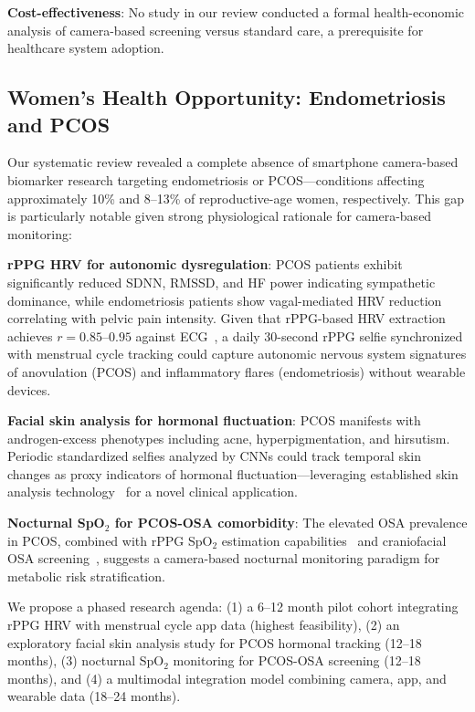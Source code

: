 \documentclass[conference]{IEEEtran}
\begin{document}
\textbf{Cost-effectiveness}: No study in our review conducted a formal health-economic analysis of camera-based screening versus standard care, a prerequisite for healthcare system adoption.

\subsection{Women's Health Opportunity: Endometriosis and PCOS}

Our systematic review revealed a complete absence of smartphone camera-based biomarker research targeting endometriosis or PCOS---conditions affecting approximately 10\% and 8--13\% of reproductive-age women, respectively. This gap is particularly notable given strong physiological rationale for camera-based monitoring:

\textbf{rPPG HRV for autonomic dysregulation}: PCOS patients exhibit significantly reduced SDNN, RMSSD, and HF power indicating sympathetic dominance, while endometriosis patients show vagal-mediated HRV reduction correlating with pelvic pain intensity. Given that rPPG-based HRV extraction achieves $r=0.85$--$0.95$ against ECG~\cite{rppgreview2024frontiers}, a daily 30-second rPPG selfie synchronized with menstrual cycle tracking could capture autonomic nervous system signatures of anovulation (PCOS) and inflammatory flares (endometriosis) without wearable devices.

\textbf{Facial skin analysis for hormonal fluctuation}: PCOS manifests with androgen-excess phenotypes including acne, hyperpigmentation, and hirsutism. Periodic standardized selfies analyzed by CNNs could track temporal skin changes as proxy indicators of hormonal fluctuation---leveraging established skin analysis technology~\cite{naqvi2023skincancer} for a novel clinical application.

\textbf{Nocturnal SpO$_2$ for PCOS-OSA comorbidity}: The elevated OSA prevalence in PCOS, combined with rPPG SpO$_2$ estimation capabilities~\cite{cheng2024contactless} and craniofacial OSA screening~\cite{osa2025jcsm}, suggests a camera-based nocturnal monitoring paradigm for metabolic risk stratification.

We propose a phased research agenda: (1) a 6--12 month pilot cohort integrating rPPG HRV with menstrual cycle app data (highest feasibility), (2) an exploratory facial skin analysis study for PCOS hormonal tracking (12--18 months), (3) nocturnal SpO$_2$ monitoring for PCOS-OSA screening (12--18 months), and (4) a multimodal integration model combining camera, app, and wearable data (18--24 months).
\end{document}
